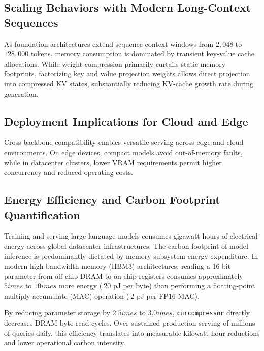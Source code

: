 \subsection{Scaling Behaviors with Modern Long-Context Sequences}
As foundation architectures extend sequence context windows from $2{,}048$ to $128{,}000$ tokens, memory consumption is dominated by transient key-value cache allocations. While weight compression primarily curtails static memory footprints, factorizing key and value projection weights allows direct projection into compressed KV states, substantially reducing KV-cache growth rate during generation.

\subsection{Deployment Implications for Cloud and Edge}
Cross-backbone compatibility enables versatile serving across edge and cloud environments. On edge devices, compact models avoid out-of-memory faults, while in datacenter clusters, lower VRAM requirements permit higher concurrency and reduced operating costs.

\subsection{Energy Efficiency and Carbon Footprint Quantification}
Training and serving large language models consumes gigawatt-hours of electrical energy across global datacenter infrastructures. The carbon footprint of model inference is predominantly dictated by memory subsystem energy expenditure. In modern high-bandwidth memory (HBM3) architectures, reading a 16-bit parameter from off-chip DRAM to on-chip registers consumes approximately $5	imes$ to $10	imes$ more energy ($~20$ pJ per byte) than performing a floating-point multiply-accumulate (MAC) operation ($~2$ pJ per FP16 MAC).

By reducing parameter storage by $2.5	imes$ to $3.0	imes$, \texttt{curcompressor} directly decreases DRAM byte-read cycles. Over sustained production serving of millions of queries daily, this efficiency translates into measurable kilowatt-hour reductions and lower operational carbon intensity.
